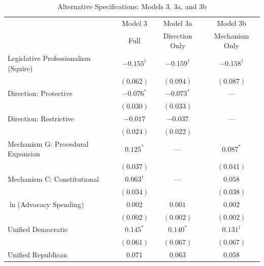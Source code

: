 \documentclass[12pt]{report}
\begin{document}
\begin{table}[htbp]
\centering
\caption{Alternative Specifications: Models 3, 3a, and 3b}
\label{tab:models_3a_3b}
\begin{threeparttable}
\begin{tabular}{lccc}
\toprule
& Model 3 & Model 3a & Model 3b \\
& Full & Direction Only & Mechanism Only \\
\midrule
Legislative Professionalism (Squire) & $-0.155^{\dagger}$ & $-0.159^{\dagger}$ & $-0.158^{\dagger}$ \\
                                     & $(0.062)$          & $(0.094)$          & $(0.087)$          \\[4pt]
Direction: Protective                & $-0.076^{*}$       & $-0.073^{*}$       & ---                \\
                                     & $(0.030)$          & $(0.033)$          &                    \\[4pt]
Direction: Restrictive               & $-0.017$           & $-0.037$           & ---                \\
                                     & $(0.024)$          & $(0.022)$          &                    \\[4pt]
Mechanism G: Procedural Expansion    & $0.125^{*}$        & ---                & $0.087^{*}$        \\
                                     & $(0.037)$          &                    & $(0.041)$          \\[4pt]
Mechanism C: Constitutional          & $0.063^{\dagger}$  & ---                & $0.058$            \\
                                     & $(0.034)$          &                    & $(0.038)$          \\[4pt]
$\ln$(Advocacy Spending)             & $0.002$            & $0.001$            & $0.002$            \\
                                     & $(0.002)$          & $(0.002)$          & $(0.002)$          \\[4pt]
Unified Democratic                   & $0.145^{*}$        & $0.140^{*}$        & $0.131^{\dagger}$  \\
                                     & $(0.061)$          & $(0.067)$          & $(0.067)$          \\[4pt]
Unified Republican                   & $0.071$            & $0.063$            & $0.058$            \\

\end{tabular}
\end{threeparttable}
\end{table}
\end{document}
